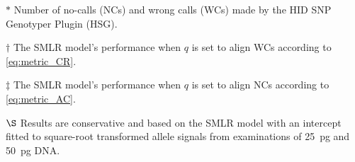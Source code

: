 \begin{table*}
\begin{adjustbox}{max width=\textwidth}
\begin{threeparttable}
\begin{tablenotes}
\item[$*$] Number of no-calls (NCs) and wrong calls (WCs) made by the HID SNP Genotyper Plugin (HSG).
\item[$\dagger$] The SMLR model's performance when $q$ is set to align WCs according to \eqref{eq:metric_CR}.
\item[$\ddagger$] The SMLR model's performance when $q$ is set to align NCs according to \eqref{eq:metric_AC}.
\item[$\S$] Results are conservative and based on the SMLR model with an intercept fitted to square-root transformed allele signals from examinations of \SI{25}{\pg} and \SI{50}{\pg} DNA.
\end{tablenotes}
\end{threeparttable}
\end{adjustbox}
\end{table*}
